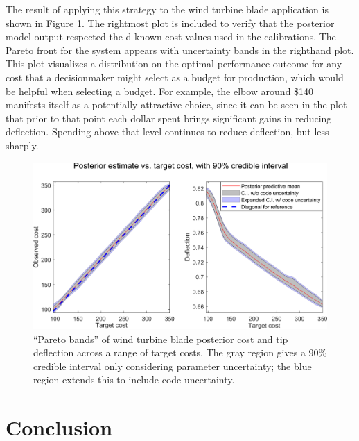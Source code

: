 \documentclass{article}
\begin{document}
%
The result of applying this strategy to the wind turbine blade application is shown in Figure \ref{fig:known_cost}. 
%
The rightmost plot is included to verify that the posterior model output respected the d-known cost values used in the calibrations.
%
The Pareto front for the system appears with uncertainty bands in the righthand plot.
%
This plot visualizes a distribution on the optimal performance outcome for any cost that a decisionmaker might select as a budget for production, which would be helpful when selecting a budget.
%
For example, the elbow around \$140 manifests itself as a potentially attractive choice, since it can be seen in the plot that prior to that point each dollar spent brings significant gains in reducing deflection.
%
Spending above that level continues to reduce deflection, but less sharply.


\begin{figure}
\centering
\includegraphics[width=.8\linewidth]{FIG_cost_grid_pareto_bands}
\captionsetup{width=.8\linewidth}
\caption{``Pareto bands'' of wind turbine blade posterior cost and tip deflection across a range of target costs. The gray region gives a 90\% credible interval only considering parameter uncertainty; the blue region extends this to include code uncertainty.}
\label{fig:known_cost}
\end{figure}




\section{Conclusion} \label{conclusion}
\end{document}
